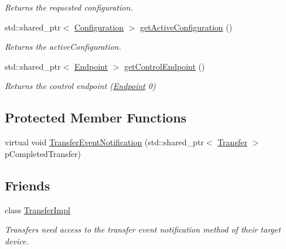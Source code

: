 \begin{DoxyCompactItemize}
\begin{DoxyCompactList}\small\item\em Returns the requested configuration. \end{DoxyCompactList}\item 
\hypertarget{class_lib_u_s_b_1_1_device_a586bcbb3872d1f079fae9f1b6ae96ef4}{std\-::shared\-\_\-ptr$<$ \hyperlink{class_lib_u_s_b_1_1_configuration}{Configuration} $>$ \hyperlink{class_lib_u_s_b_1_1_device_a586bcbb3872d1f079fae9f1b6ae96ef4}{get\-Active\-Configuration} ()}\label{class_lib_u_s_b_1_1_device_a586bcbb3872d1f079fae9f1b6ae96ef4}

\begin{DoxyCompactList}\small\item\em Returns the active\-Configuration. \end{DoxyCompactList}\item 
\hypertarget{class_lib_u_s_b_1_1_device_a0d24eae437e17a93ccdfa2a249650fc5}{std\-::shared\-\_\-ptr$<$ \hyperlink{class_lib_u_s_b_1_1_endpoint}{Endpoint} $>$ \hyperlink{class_lib_u_s_b_1_1_device_a0d24eae437e17a93ccdfa2a249650fc5}{get\-Control\-Endpoint} ()}\label{class_lib_u_s_b_1_1_device_a0d24eae437e17a93ccdfa2a249650fc5}

\begin{DoxyCompactList}\small\item\em Returns the control endpoint (\hyperlink{class_lib_u_s_b_1_1_endpoint}{Endpoint} 0) \end{DoxyCompactList}\end{DoxyCompactItemize}
\subsection*{Protected Member Functions}
\begin{DoxyCompactItemize}
\item 
virtual void \hyperlink{class_lib_u_s_b_1_1_device_a2b7f495eb8c2693602f212c2c2773f15}{Transfer\-Event\-Notification} (std\-::shared\-\_\-ptr$<$ \hyperlink{class_lib_u_s_b_1_1_transfer}{Transfer} $>$ p\-Completed\-Transfer)
\end{DoxyCompactItemize}
\subsection*{Friends}
\begin{DoxyCompactItemize}
\item 
\hypertarget{class_lib_u_s_b_1_1_device_aed9f2bd8ff81bd3986d935f9aa242d1b}{class \hyperlink{class_lib_u_s_b_1_1_device_aed9f2bd8ff81bd3986d935f9aa242d1b}{Transfer\-Impl}}\label{class_lib_u_s_b_1_1_device_aed9f2bd8ff81bd3986d935f9aa242d1b}

\begin{DoxyCompactList}\small\item\em Transfers need access to the transfer event notification method of their target device. \end{DoxyCompactList}\end{DoxyCompactItemize}



